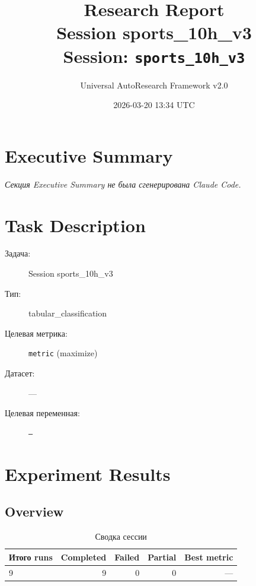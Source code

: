 \documentclass[12pt,a4paper]{article}
\title{
    \Large\textbf{Research Report}\\[0.5em]
    \large Session sports\_10h\_v3\\[0.3em]
    \normalsize Session: \texttt{sports\_10h\_v3}
}
\author{Universal AutoResearch Framework v2.0}
\date{2026-03-20 13:34 UTC}
\begin{document}
\maketitle
\tableofcontents
\newpage


\section{Executive Summary}

\textit{Секция Executive Summary не была сгенерирована Claude Code.}



\section{Task Description}

\begin{description}
    \item[Задача:] Session sports\_10h\_v3
    \item[Тип:] tabular\_classification
    \item[Целевая метрика:] \texttt{metric}
        (maximize)
    \item[Датасет:] ---
    \item[Целевая переменная:] \texttt{---}
\end{description}




\section{Experiment Results}

\subsection{Overview}

\begin{table}[H]
\centering
\caption{Сводка сессии}
\begin{tabular}{lrrrr}
\toprule
Итого runs & Completed & Failed & Partial & Best metric \\
\midrule
9 & \textcolor{passcolor}{9}
    & \textcolor{failcolor}{0}
    & \textcolor{partialcolor}{0}
    & --- \\
\bottomrule
\end{tabular}
\end{table}
\end{document}
